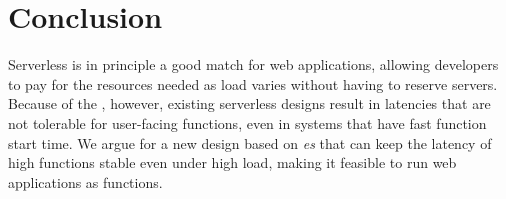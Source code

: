 \section{Conclusion}

Serverless is in principle a good match for web applications, allowing
developers to pay for the resources needed as load varies without having to
reserve servers. Because of the \problem, however, existing serverless designs
result in latencies that are not tolerable for user-facing functions, even in
systems that have fast function start time.  We argue for a new design based on
\emph{\priceclass{}es} that can keep the latency of high \class{} functions
stable even under high load, making it feasible to run web applications as
functions.
